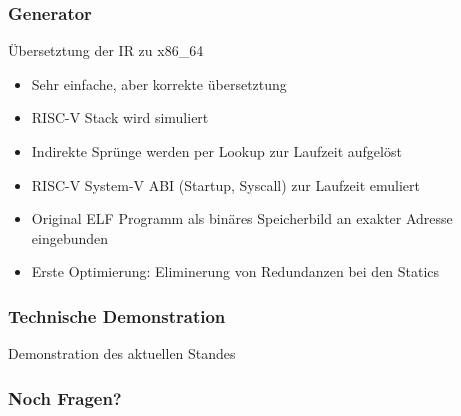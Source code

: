 \begin{frame}
    \frametitle{Generator}{Übersetztung der IR zu x86\_64}
    \pause{}
    \begin{itemize}
        \item Sehr einfache, aber korrekte übersetztung
              \pause{}
        \item RISC-V Stack wird simuliert %
              \pause{}
        \item Indirekte Sprünge werden per Lookup zur Laufzeit aufgelöst
              \pause{}
        \item RISC-V System-V ABI (Startup, Syscall) zur Laufzeit emuliert
              \pause{}
        \item Original ELF Programm als binäres Speicherbild an exakter Adresse eingebunden
              \pause{}
        \item Erste Optimierung: Eliminerung von Redundanzen bei den Statics
    \end{itemize}
\end{frame}
\clearpage


\begin{frame}
    \frametitle{Technische Demonstration}{Demonstration des aktuellen Standes}

\end{frame}
\clearpage


\begin{frame}
    \frametitle{Noch Fragen?}{}
\end{frame}

